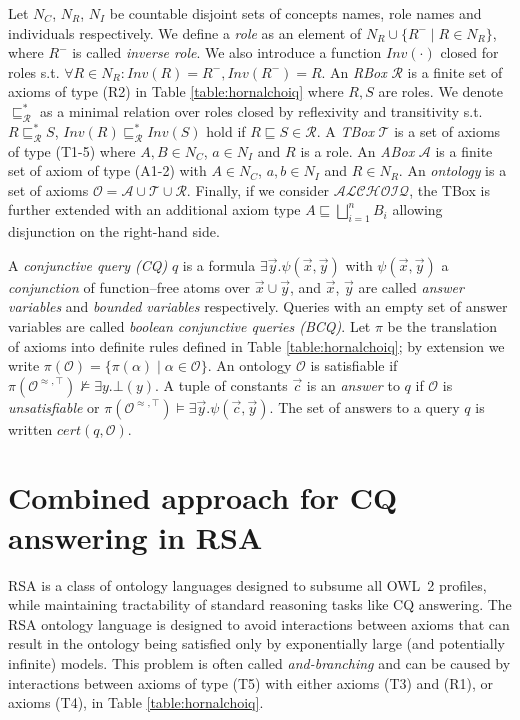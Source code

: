 \documentclass[runningheads]{llncs}
\newcommand{\alchoiq}{$\mathcal{ALCHOIQ}$\xspace}
\begin{document}
Let $N_C$, $N_R$, $N_I$ be countable disjoint sets of concepts names, role names and individuals respectively.
We define a \emph{role} as an element of $N_R \cup \{R^- \mid R \in N_R\}$, where $R^-$ is called \emph{inverse role}.
We also introduce a function $Inv(\cdot)$ closed for roles s.t. $\forall R \in N_R : Inv(R) = R^-, Inv(R^-) = R$.
An \emph{RBox} $\mathcal{R}$ is a finite set of axioms of type (R2) in Table \ref{table:hornalchoiq} where $R, S$ are roles.
We denote $\sqsubseteq^*_\mathcal{R}$ as a minimal relation over roles closed by reflexivity and transitivity s.t. $R \sqsubseteq^*_\mathcal{R} S$, $Inv(R) \sqsubseteq^*_\mathcal{R} Inv(S)$ hold if $R \sqsubseteq S \in \mathcal{R}$.
A \emph{TBox} $\mathcal{T}$ is a set of axioms of type (T1-5) where $A, B \in N_C$, $a \in N_I$ and $R$ is a role.
An \emph{ABox} $\mathcal{A}$ is a finite set of axiom of type (A1-2) with $A \in N_C$, $a,b \in N_I$ and $R \in N_R$.
An \emph{ontology} is a set of axioms $\mathcal{O} = \mathcal{A} \cup \mathcal{T} \cup \mathcal{R}$.
Finally, if we consider \alchoiq, the TBox is further extended with an additional axiom type $A \sqsubseteq \bigsqcup_{i=1}^n B_i$ allowing disjunction on the right-hand side.

A \emph{conjunctive query (CQ)} $q$ is a formula $\exists \vec{y} . \psi(\vec{x}, \vec{y})$ with $\psi(\vec{x}, \vec{y})$ a \emph{conjunction} of function--free atoms over $\vec{x} \cup \vec{y}$, and $\vec{x}$, $\vec{y}$ are called \emph{answer variables} and \emph{bounded variables} respectively.
Queries with an empty set of answer variables are called \emph{boolean conjunctive queries (BCQ)}.
Let $\pi$ be the translation of axioms into definite rules defined in Table \ref{table:hornalchoiq};
by extension we write $\pi(\mathcal{O}) = \{ \pi(\alpha) \mid \alpha \in \mathcal{O} \}$.
An ontology $\mathcal{O}$ is satisfiable if $\pi(\mathcal{O}^{\approx,\top}) \not\models \exists y . \bot(y)$.
A tuple of constants $\vec{c}$ is an \emph{answer} to $q$ if $\mathcal{O}$ is \emph{unsatisfiable} or $\pi(\mathcal{O}^{\approx,\top}) \models \exists \vec{y} . \psi(\vec{c},\vec{y})$.
The set of answers to a query $q$ is written $cert(q,\mathcal{O})$.

\section{Combined approach for CQ answering in RSA}\label{sec:combined_approach_for_cq_answering_in_rsa}

RSA is a class of ontology languages designed to subsume all OWL~2 profiles, while maintaining tractability of standard reasoning tasks like CQ answering.
The RSA ontology language is designed to avoid interactions between axioms that can result in the ontology being satisfied only by exponentially large (and potentially infinite) models.
This problem is often called \emph{and-branching} and can be caused by interactions between axioms of type (T5) with either axioms (T3) and (R1), or axioms (T4), in Table \ref{table:hornalchoiq}. 
\end{document}
